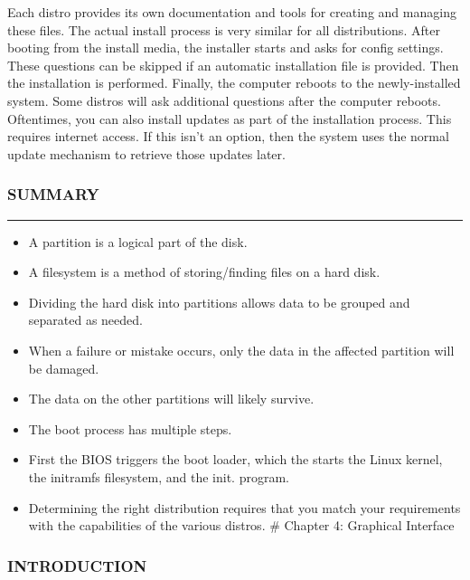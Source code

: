 Each distro provides its own documentation and tools for creating and
managing these files. The actual install process is very similar for all
distributions. After booting from the install media, the installer
starts and asks for config settings. These questions can be skipped if
an automatic installation file is provided. Then the installation is
performed. Finally, the computer reboots to the newly-installed system.
Some distros will ask additional questions after the computer reboots.
Oftentimes, you can also install updates as part of the installation
process. This requires internet access. If this isn't an option, then
the system uses the normal update mechanism to retrieve those updates
later.

\subsubsection{SUMMARY}\label{summary-2}

\begin{center}\rule{3in}{0.4pt}\end{center}

\begin{itemize}
\itemsep1pt\parskip0pt
\item
  A partition is a logical part of the disk.
\item
  A filesystem is a method of storing/finding files on a hard disk.
\item
  Dividing the hard disk into partitions allows data to be grouped and
  separated as needed.
\item
  When a failure or mistake occurs, only the data in the affected
  partition will be damaged.
\item
  The data on the other partitions will likely survive.
\item
  The boot process has multiple steps.
\item
  First the BIOS triggers the boot loader, which the starts the Linux
  kernel, the initramfs filesystem, and the init. program.
\item
  Determining the right distribution requires that you match your
  requirements with the capabilities of the various distros. \# Chapter
  4: Graphical Interface
\end{itemize}

\subsubsection{INTRODUCTION}\label{introduction-3}

